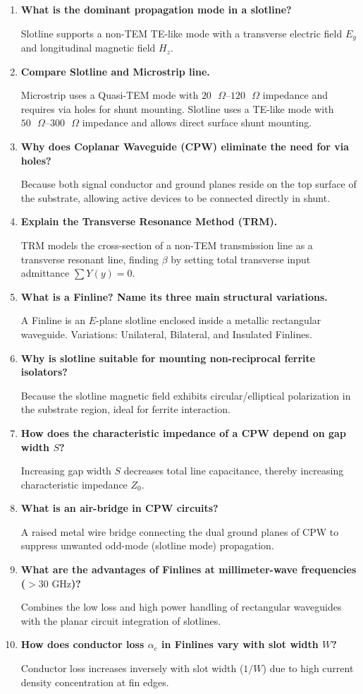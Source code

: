 \documentclass[10pt,a4paper]{article}
\newcommand{\Q}[1]{\textbf{#1}\par\vspace{2pt}}
\begin{document}
\begin{tcolorbox}[exambox, title={\textbf{Frequently Asked / Viva Questions}}]
  \begin{enumerate}[topsep=0pt, label=\textbf{Q\arabic*.}, itemsep=5pt]
    \item \Q{What is the dominant propagation mode in a slotline?}
    Slotline supports a non-TEM TE-like mode with a transverse electric field $E_y$ and longitudinal magnetic field $H_z$.

    \item \Q{Compare Slotline and Microstrip line.}
    Microstrip uses a Quasi-TEM mode with $20\text{ }\Omega$--$120\text{ }\Omega$ impedance and requires via holes for shunt mounting. Slotline uses a TE-like mode with $50\text{ }\Omega$--$300\text{ }\Omega$ impedance and allows direct surface shunt mounting.

    \item \Q{Why does Coplanar Waveguide (CPW) eliminate the need for via holes?}
    Because both signal conductor and ground planes reside on the top surface of the substrate, allowing active devices to be connected directly in shunt.

    \item \Q{Explain the Transverse Resonance Method (TRM).}
    TRM models the cross-section of a non-TEM transmission line as a transverse resonant line, finding $\beta$ by setting total transverse input admittance $\sum Y(y) = 0$.

    \item \Q{What is a Finline? Name its three main structural variations.}
    A Finline is an $E$-plane slotline enclosed inside a metallic rectangular waveguide. Variations: Unilateral, Bilateral, and Insulated Finlines.

    \item \Q{Why is slotline suitable for mounting non-reciprocal ferrite isolators?}
    Because the slotline magnetic field exhibits circular/elliptical polarization in the substrate region, ideal for ferrite interaction.

    \item \Q{How does the characteristic impedance of a CPW depend on gap width $S$?}
    Increasing gap width $S$ decreases total line capacitance, thereby increasing characteristic impedance $Z_0$.

    \item \Q{What is an air-bridge in CPW circuits?}
    A raised metal wire bridge connecting the dual ground planes of CPW to suppress unwanted odd-mode (slotline mode) propagation.

    \item \Q{What are the advantages of Finlines at millimeter-wave frequencies ($>30\text{ GHz}$)?}
    Combines the low loss and high power handling of rectangular waveguides with the planar circuit integration of slotlines.

    \item \Q{How does conductor loss $\alpha_c$ in Finlines vary with slot width $W$?}
    Conductor loss increases inversely with slot width ($1/W$) due to high current density concentration at fin edges.
  \end{enumerate}
\end{tcolorbox}
\end{document}
